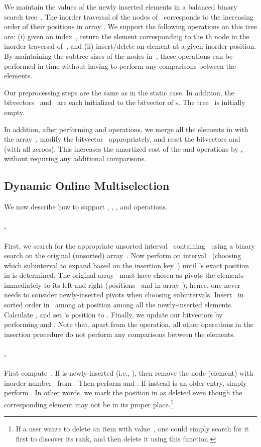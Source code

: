 We maintain the values of the newly inserted elements in a balanced binary search tree~. The  inorder traversal of the nodes of~ corresponds to the increasing order of their positions in array . 
We support the following operations on this tree are: (i) given an index~, return the element corresponding to the th node in the inorder traversal of~,
and (ii) insert/delete an element at a given inorder position.
By maintaining the subtree sizes of the nodes in~, these operations
 can be performed in  time 
without having to perform any comparisons between the elements.

Our preprocessing steps are the same as in the static case. In addition, the bitvectors~ 
and~ are each initialized to the bitvector of  \zero s. The tree~ is initially empty.

In addition, after performing   and  operations, we merge all the elements 
in  with the array~, modify the bitvector~ appropriately, and 
reset the bitvectors  and  (with all zeroes). This increases the 
amortized cost of the  and  operations by , without requiring any additional
comparisons.

\subsection{Dynamic Online Multiselection}
\label{subsec:internal-dynamic}

We now describe how to support , , , and  
operations.


\paragraph{.} First, we search for the appropriate unsorted interval~ containing~ using a binary search on the original (unsorted) array~.
Now perform  on interval~ (choosing which subinterval 
to expand based on the insertion key~) until 's exact position~ in 
 is determined. The original array~ must have chosen as pivots the 
elements immediately to its left and right (positions~ and  in array~); 
hence, one never needs to consider newly-inserted pivots when choosing subintervals.
Insert~ in sorted order in~ among at position  among 
all the newly-inserted elements.  Calculate , and set 's 
position to . Finally, we update our bitvectors by 
performing  and .
Note that, apart from the  operation, all other operations in the 
insertion procedure do not perform any comparisons between the elements.

\paragraph{.} First compute~. 
If  is newly-inserted (i.e., ), then remove the node 
(element) with inorder number~ from .
Then perform  and . 
If instead  is an older entry, 
simply perform . In other words, 
we mark the position  in  as deleted even though the corresponding 
element may not be in its proper place.\footnote{If a user wants to 
delete an item with value~, one could simply search for it first to 
discover its rank, and then delete it using this function.}


